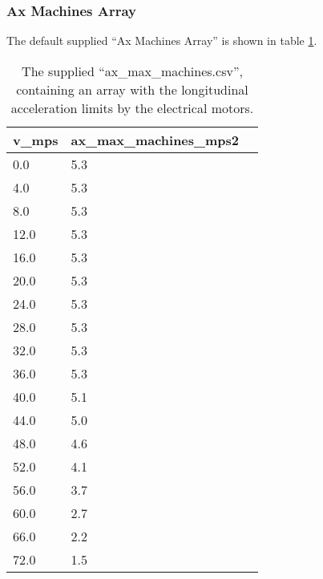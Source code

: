 \pagebreak

\subsubsection{Ax Machines Array} \label{sec:Appendix Ax Machines Array}
The default supplied ``Ax Machines Array'' is shown in table \ref{tab:Ax Machines Array}.
\begin{table}[H]
    \centering
    \begin{tabular}{|l|l|l|}
        \hline
        \textbf{v\_mps} & \textbf{ax\_max\_machines\_mps2} \\ \hline
        0.0             & 5.3                              \\ \hline
        4.0             & 5.3                              \\ \hline
        8.0             & 5.3                              \\ \hline
        12.0            & 5.3                              \\ \hline
        16.0            & 5.3                              \\ \hline
        20.0            & 5.3                              \\ \hline
        24.0            & 5.3                              \\ \hline
        28.0            & 5.3                              \\ \hline
        32.0            & 5.3                              \\ \hline
        36.0            & 5.3                              \\ \hline
        40.0            & 5.1                              \\ \hline
        44.0            & 5.0                              \\ \hline
        48.0            & 4.6                              \\ \hline
        52.0            & 4.1                              \\ \hline
        56.0            & 3.7                              \\ \hline
        60.0            & 2.7                              \\ \hline
        66.0            & 2.2                              \\ \hline
        72.0            & 1.5                              \\ \hline
    \end{tabular}
    \caption{The supplied ``ax\_max\_machines.csv'', containing an array with the longitudinal acceleration limits by the electrical motors.}
    \label{tab:Ax Machines Array}
\end{table}

